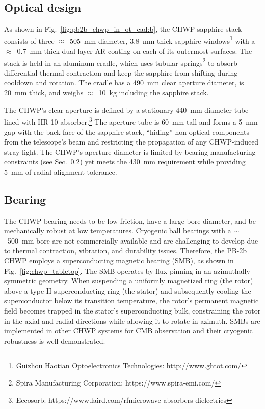 
\subsection{Optical design}
\label{sec:optical_design}

As shown in Fig.~\ref{fig:pb2b_chwp_in_ot_cad:b}, the CHWP sapphire stack consists of three $\approx$~505~mm diameter, 3.8~mm-thick sapphire windows\footnote{Guizhou Haotian Optoelectronics Technologies: http://www.ghtot.com/} with a $\approx$~0.7~mm thick dual-layer AR coating on each of its outermost surfaces. The stack is held in an aluminum cradle, which uses tubular springs\footnote{Spira Manufacturing Corporation: https://www.spira-emi.com/} to absorb differential thermal contraction and keep the sapphire from shifting during cooldown and rotation. The cradle has a 490~mm clear aperture diameter, is 20~mm thick, and weighs $\approx$~10~kg including the sapphire stack.

The CHWP's clear aperture is defined by a stationary 440~mm diameter tube lined with HR-10 absorber.\footnote{Eccosorb: https://www.laird.com/rfmicrowave-absorbers-dielectrics} The aperture tube is 60~mm tall and forms a 5~mm gap with the back face of the sapphire stack, ``hiding'' non-optical components from the telescope's beam and restricting the propagation of any CHWP-induced stray light. The CHWP's aperture diameter is limited by bearing manufacturing constraints (see Sec.~\ref{sec:bearing}) yet meets the 430~mm requirement while providing 5~mm of radial alignment tolerance. 


\subsection{Bearing}
\label{sec:bearing}

The CHWP bearing needs to be low-friction, have a large bore diameter, and be mechanically robust at low temperatures. Cryogenic ball bearings with a $\sim$~500~mm bore are not commercially available and are challenging to develop due to thermal contraction, vibration, and durability issues. Therefore, the PB-2b CHWP employs a superconducting magnetic bearing (SMB), as shown in Fig.~\ref{fig:chwp_tabletop}. The SMB operates by flux pinning in an azimuthally symmetric geometry. When suspending a uniformly magnetized ring (the rotor) above a type-II superconducting ring (the stator) and subsequently cooling the superconductor below its transition temperature, the rotor's permanent magnetic field becomes trapped in the stator's superconducting bulk, constraining the rotor in the axial and radial directions while allowing it to rotate in azimuth. SMBs are implemented in other CHWP systems for CMB observation \cite{matsumura_cosmic_2006,klein_cryogenic_2011,sakurai_estimation_2017,Sakurai2018a,Sakurai2020} and their cryogenic robustness is well demonstrated.

